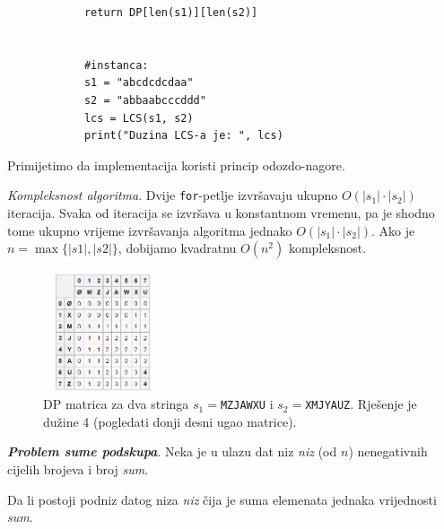 \begin{solution}
\begin{verbatim}
	    	return DP[len(s1)][len(s2)]        
	    		           
	    	      
	    	#instanca:
	    	s1 = "abcdcdcdaa"
	    	s2 = "abbaabcccddd"
	    	lcs = LCS(s1, s2)
	    	print("Duzina LCS-a je: ", lcs)     
 \end{verbatim}
	     Primijetimo da implementacija koristi princip odozdo-nagore.
	     
	     \textit{Kompleksnost algoritma}. Dvije \texttt{for}-petlje  izvršavaju ukupno $O(|s_1|\cdot |s_2|)$ iteracija. Svaka od iteracija se izvršava u konstantnom vremenu, pa je shodno tome ukupno vrijeme izvršavanja algoritma jednako $O(|s_1| \cdot |s_2|)$. Ako je $n = \max\{|s1|, |s2|\}$, dobijamo kvadratnu $O(n^2)$ kompleksnost. 
	     
	     \begin{figure}[H]
	     	\centering
	     	\includegraphics[width=100pt,height=100pt]{slike/dp-lcs-table.png}
	     	\caption{DP matrica za dva stringa $s_1=$\texttt{MZJAWXU} i $s_2=$\texttt{XMJYAUZ}. Rješenje je dužine 4 (pogledati donji desni ugao matrice). }
	     \end{figure}
 	      
\end{solution}


\begin{example}
	\textbf{\textit{Problem sume podskupa}}. Neka je u ulazu dat niz \emph{niz} (od $n$) nenegativnih cijelih brojeva i broj \textit{sum}. 
	
	Da li postoji podniz datog niza \emph{niz} čija je suma elemenata
	  jednaka vrijednosti  \textit{sum}.
\end{example}

